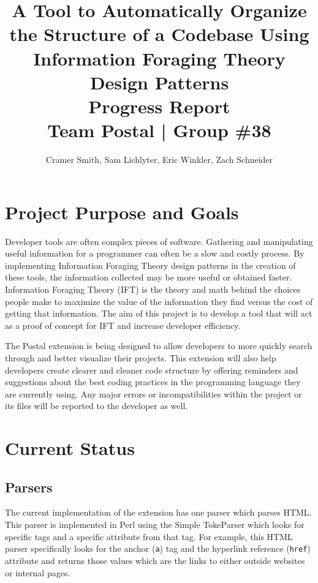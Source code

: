 \documentclass[letterpaper,10pt,titlepage,draftclsnofoot,onecolumn,onesided] {IEEEtran}
\def\doctitle{A Tool to Automatically Organize the Structure of a Codebase Using Information Foraging Theory Design Patterns}
\def\doctype{Progress Report}
\def\team{Team Postal | Group \#38}
\begin{document}
\title{\Huge{\bfseries{\textsf{\doctitle}}}\\\textsf{\Large{\doctype}}\\\textsf{\large{\team}}}
\author{Cramer Smith, Sam Lichlyter, Eric Winkler, Zach Schneider}

\maketitle
\vfill

\vfill

\pagebreak

\tableofcontents


\pagebreak

\section{Project Purpose and Goals}
Developer tools are often complex pieces of software. 
Gathering and manipulating useful information for a programmer can often be a slow and costly process. 
By implementing Information Foraging Theory design patterns in the creation of these tools, the information collected may be more useful or obtained faster. 
Information Foraging Theory (IFT) is the theory and math behind the choices people make to maximize the value of the information they find versus the cost of getting that information.
The aim of this project is to develop a tool that will act as a proof of concept for IFT and increase developer efficiency.

The Postal extension is being designed to allow developers to more quickly search through and better visualize their projects.
This extension will also help developers create clearer and cleaner code structure by offering reminders and suggestions about the best coding practices in the programming language they are currently using.
Any major errors or incompatibilities within the project or its files will be reported to the developer as well.


\section{Current Status}
\subsection{Parsers}
The current implementation of the extension has one parser which parses HTML.
This parser is implemented in Perl using the Simple TokeParser which looks for specific tags and a specific attribute from that tag.
For example, this HTML parser specifically looks for the anchor (\verb|a|) tag and the hyperlink reference (\verb|href|) attribute and returns those values which are the links to either outside websites or internal pages.
\end{document}
